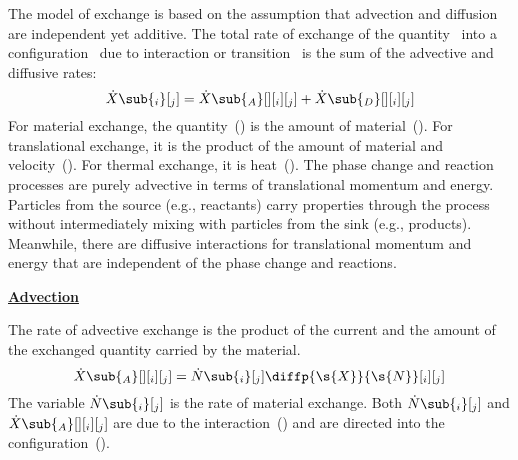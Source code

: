 The model of exchange is based on the assumption that advection and diffusion are independent yet additive.  The total rate of exchange of the quantity~ into a configuration~ due to interaction or transition~ is the sum of the advective and diffusive rates:
\begin{equation}
  \label{eq:Exchange}
  \dot{X}\sub{_i}[_j] = \dot{X}\sub{_A}[ ][_i][_j] + \dot{X}\sub{_D}[ ][_i][_j]
\end{equation}
For material exchange, the quantity~() is the amount of material~().   For translational exchange, it is the product of the amount of material and velocity~().  For thermal exchange, it is heat~().  The phase change and reaction processes are purely advective in terms of translational momentum and energy.  Particles from the source (e.g., reactants) carry properties through the process without intermediately mixing with particles from the sink (e.g., products).  Meanwhile, there are diffusive interactions for translational momentum and energy that are independent of the phase change and reactions.



\noindent\underline{\textbf{Advection}}

The rate of advective exchange is the product of the current and the amount of the exchanged quantity carried by the material.
\begin{equation}
  \label{eq:AdvectiveExchange1}
  \dot{X}\sub{_A}[ ][_i][_j] = \dot{N}\sub{_i}[_j]\diffp{\s{X}}{\s{N}}[_i][_j]
\end{equation}
The variable $\dot{N}\sub{_i}[_j]$ is the rate of material exchange.  Both $\dot{N}\sub{_i}[_j]$ and $\dot{X}\sub{_A}[ ][_i][_j]$ are due to the interaction~() and are directed into the configuration~().


